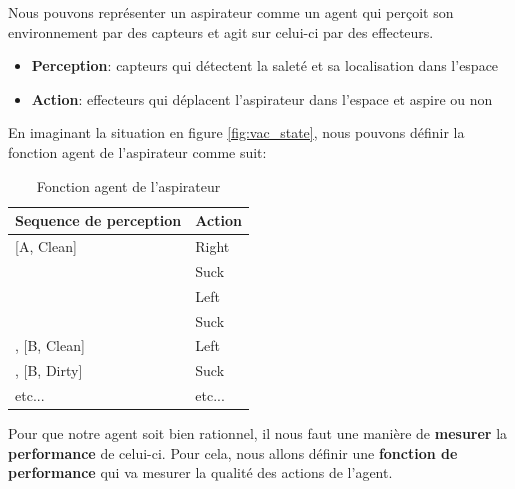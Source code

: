 \documentclass[a4paper, 12pt]{extarticle}
\begin{document}
\begin{example}\leavevmode
    Nous pouvons représenter un aspirateur comme un agent qui perçoit son environnement par des capteurs et agit sur celui-ci par des effecteurs.
    \begin{itemize}
        \item \textbf{Perception}: capteurs qui détectent la saleté et sa localisation dans l'espace
        \item \textbf{Action}: effecteurs qui déplacent l'aspirateur dans l'espace et aspire ou non
    \end{itemize}
    En imaginant la situation en figure \ref{fig:vac_state}, nous pouvons définir la fonction agent de l'aspirateur comme suit:
    \begin{table}[H]
        \caption{Fonction agent de l'aspirateur}\label{tab:agent_func}
        \begin{center}
            \begin{tabular}[c]{|l|l|}
                \hline
                \multicolumn{1}{|c|}{\textbf{Sequence de perception}} & 
                \multicolumn{1}{c|}{\textbf{Action}} \\
                \hline

                [A, Clean] & Right \\
                \hline
                [A, Dirty] & Suck \\
                \hline
                [B, Clean] & Left\\
                \hline
                [B, Dirty] & Suck\\
                \hline
                [A, Clean], [B, Clean] & Left\\
                \hline
                [A, Clean], [B, Dirty] & Suck\\
                \hline
                etc... & etc...\\
                \hline
            \end{tabular}
        \end{center}
    \end{table}
\end{example}

Pour que notre agent soit bien rationnel, il nous faut une manière de \textbf{mesurer} la \textbf{performance}
de celui-ci. Pour cela, nous allons définir une \textbf{fonction de performance} qui va mesurer la qualité des actions de l'agent.
\end{document}
